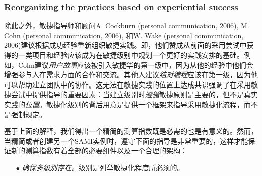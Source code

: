 \documentclass[twocolumn]{svjour3}[]
\begin{document}
\subsubsection{Reorganizing the practices based on experiential success}

除此之外，敏捷指导师和顾问A. Cockburn (personal communication, 2006), M. Cohn (personal communication, 2006), 和W. Wake (personal communication, 2006)建议根据成功经验重新组织敏捷实践。即，他们赞成从前面的采用尝试中获得的一类项目和经验应该成为在敏捷级别中规划一个更好的实践安排的基础。例如，Cohn建议\textit{用户故事}应该被引入敏捷华的第一级中，因为从他的经验中他们会增强参与人在需求方面的合作和交流。其他人建议\textit{结对编程}应该在第一级，因为他可以帮助建立团队中的协作。这无法在敏捷实践的位置上达成共识强调了在采用敏捷尝试中提供指导的重要因素：当建立级别时\textit{遵循}敏捷原则是主要的，但不是真实实践的\textit{位置}。敏捷化级别的背后用意是提供一个框架来指导采用敏捷化流程，而不是强制规定。

基于上面的解释，我们得出一个精简的测算指数既是必需的也是有意义的。然而，当精简或者创建另一个SAMI实例时，遵守下面的指导是非常重要的，这样才能保证新的测算指数有着全部的必要组件以及一个合理的架构：

\begin{itemize}
    \item[$\bullet$] \textit{确保多级别存在。}级别是列举敏捷化程度所必须的。
\end{itemize}



\end{document}
